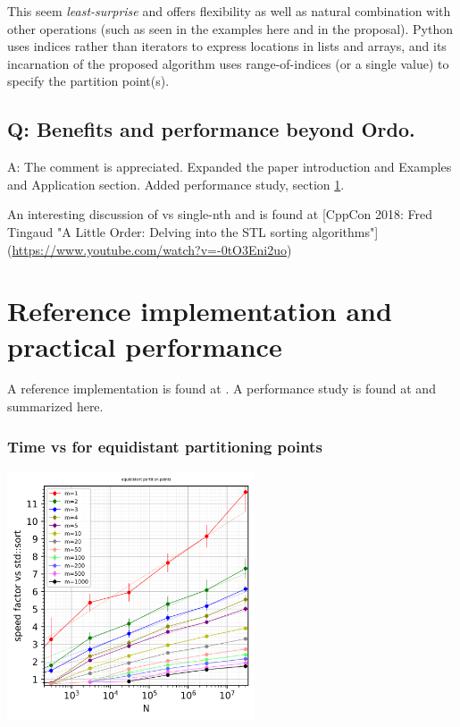 This seem \emph{least-surprise} and offers flexibility as well as natural combination with other operations (such as seen in the examples here and in the proposal). Python uses indices rather than iterators to express locations in lists and arrays, and its incarnation of the proposed algorithm uses range-of-indices (or a single value) to specify the partition point(s)\cite{NpPart}.

\subsection{Q: Benefits and performance beyond Ordo.}

A: The comment is appreciated. Expanded the paper introduction and Examples and Application section. Added performance study, section \ref{perfstudy}.

An interesting discussion of  vs single-nth  and  is found at [CppCon 2018: Fred Tingaud "A Little Order: Delving into the STL sorting algorithms"](\url{https://www.youtube.com/watch?v=-0tO3Eni2uo})

\newpage
\section{Reference implementation and practical performance}
\label{perfstudy}

A reference implementation is found at \cite{p2375src}. A performance study is found at \cite{p2375RefImpl} and summarized here. 
\subsubsection*{Time vs  for equidistant partitioning points}

\begin{center}
\includegraphics[width=0.55\textwidth]{plotting/images/partition_points_equidistant_speed_for_n_vs_sort.png}
\end{center}

